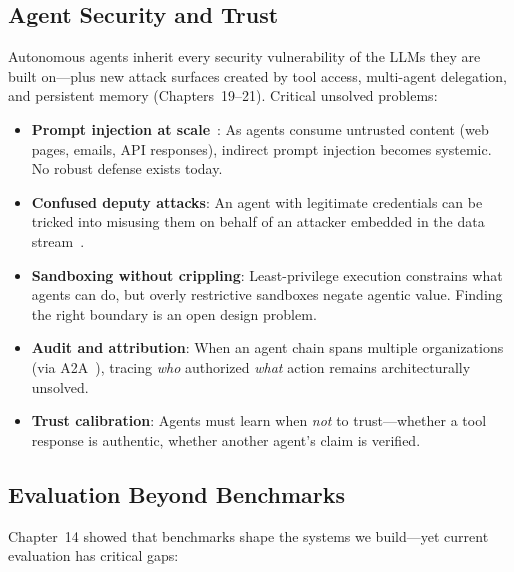 \subsection{Agent Security and Trust}
\label{agent-security-and-trust}

Autonomous agents inherit every security vulnerability of the LLMs they are built on---plus new attack surfaces created by tool access, multi-agent delegation, and persistent memory (Chapters~19--21). Critical unsolved problems:

\begin{itemize}
  \item \textbf{Prompt injection at scale}~\cite{greshake2023indirect}: As agents consume untrusted content (web pages, emails, API responses), indirect prompt injection becomes systemic. No robust defense exists today.
  \item \textbf{Confused deputy attacks}: An agent with legitimate credentials can be tricked into misusing them on behalf of an attacker embedded in the data stream~\cite{anthropic-mcp-2024}.
  \item \textbf{Sandboxing without crippling}: Least-privilege execution constrains what agents can do, but overly restrictive sandboxes negate agentic value. Finding the right boundary is an open design problem.
  \item \textbf{Audit and attribution}: When an agent chain spans multiple organizations (via A2A~\cite{google-a2a-2025}), tracing \emph{who} authorized \emph{what} action remains architecturally unsolved.
  \item \textbf{Trust calibration}: Agents must learn when \emph{not} to trust---whether a tool response is authentic, whether another agent’s claim is verified.
\end{itemize}

\subsection{Evaluation Beyond Benchmarks}
\label{evaluation-beyond-benchmarks}

Chapter~14 showed that benchmarks shape the systems we build---yet current evaluation has critical gaps:

